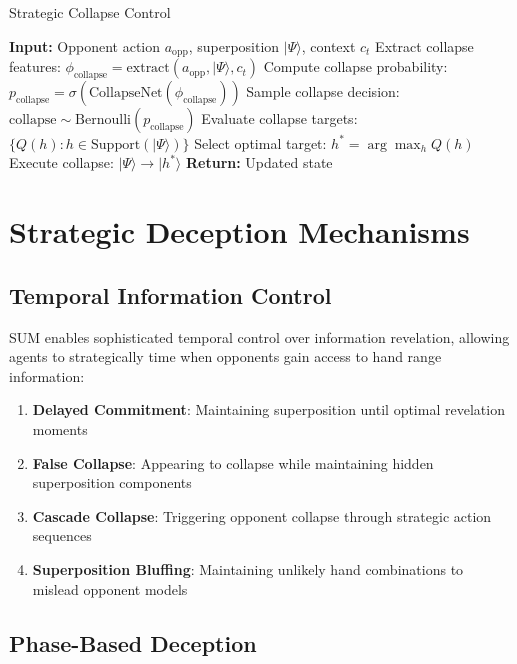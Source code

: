\documentclass[11pt,a4paper]{article}
\begin{document}
\begin{algorithm}
\caption{Strategic Collapse Control}
\begin{algorithmic}[1]
\STATE \textbf{Input:} Opponent action $a_{\text{opp}}$, superposition $|\Psi\rangle$, context $c_t$
\STATE Extract collapse features: $\phi_{\text{collapse}} = \text{extract}(a_{\text{opp}}, |\Psi\rangle, c_t)$
\STATE Compute collapse probability: $p_{\text{collapse}} = \sigma(\text{CollapseNet}(\phi_{\text{collapse}}))$
\STATE Sample collapse decision: $\text{collapse} \sim \text{Bernoulli}(p_{\text{collapse}})$
    \STATE Evaluate collapse targets: $\{Q(h) : h \in \text{Support}(|\Psi\rangle)\}$
    \STATE Select optimal target: $h^* = \arg\max_h Q(h)$
    \STATE Execute collapse: $|\Psi\rangle \rightarrow |h^*\rangle$
\ENDIF
\STATE \textbf{Return:} Updated state
\end{algorithmic}
\end{algorithm}

\section{Strategic Deception Mechanisms}

\subsection{Temporal Information Control}

SUM enables sophisticated temporal control over information revelation, allowing agents to strategically time when opponents gain access to hand range information:

\begin{enumerate}
\item \textbf{Delayed Commitment}: Maintaining superposition until optimal revelation moments
\item \textbf{False Collapse}: Appearing to collapse while maintaining hidden superposition components
\item \textbf{Cascade Collapse}: Triggering opponent collapse through strategic action sequences
\item \textbf{Superposition Bluffing}: Maintaining unlikely hand combinations to mislead opponent models
\end{enumerate}

\subsection{Phase-Based Deception}
\end{document}
